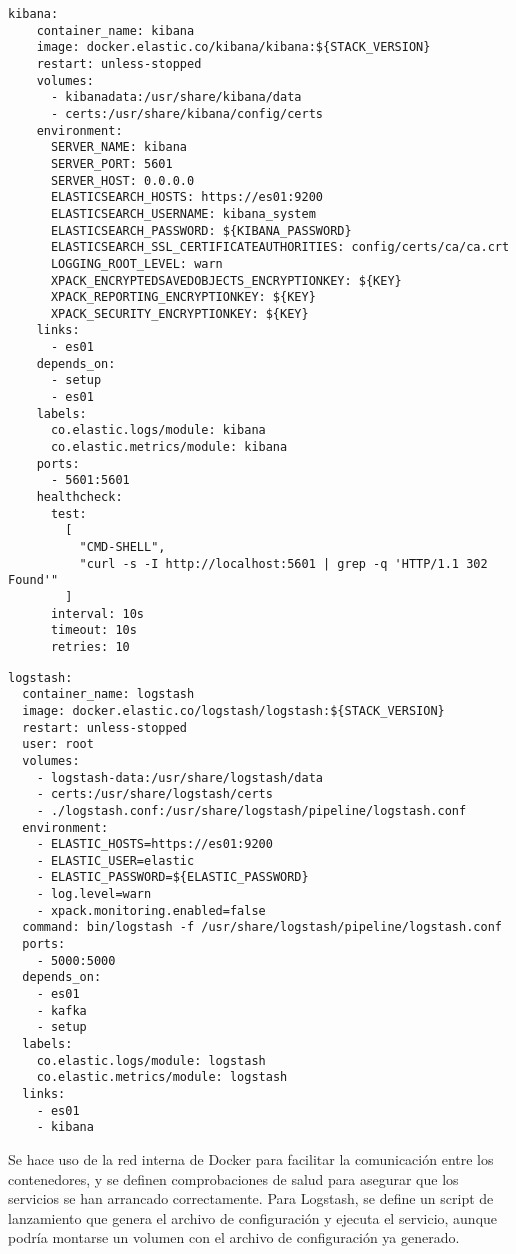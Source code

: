 \begin{lstlisting}[style=yaml, caption={Definición de los servicios de Kibana}]
kibana:
    container_name: kibana
    image: docker.elastic.co/kibana/kibana:${STACK_VERSION}
    restart: unless-stopped
    volumes:
      - kibanadata:/usr/share/kibana/data
      - certs:/usr/share/kibana/config/certs
    environment:
      SERVER_NAME: kibana
      SERVER_PORT: 5601
      SERVER_HOST: 0.0.0.0
      ELASTICSEARCH_HOSTS: https://es01:9200
      ELASTICSEARCH_USERNAME: kibana_system
      ELASTICSEARCH_PASSWORD: ${KIBANA_PASSWORD}
      ELASTICSEARCH_SSL_CERTIFICATEAUTHORITIES: config/certs/ca/ca.crt
      LOGGING_ROOT_LEVEL: warn
      XPACK_ENCRYPTEDSAVEDOBJECTS_ENCRYPTIONKEY: ${KEY}
      XPACK_REPORTING_ENCRYPTIONKEY: ${KEY}
      XPACK_SECURITY_ENCRYPTIONKEY: ${KEY}
    links:
      - es01
    depends_on:
      - setup
      - es01
    labels:
      co.elastic.logs/module: kibana
      co.elastic.metrics/module: kibana
    ports:
      - 5601:5601
    healthcheck:
      test:
        [
          "CMD-SHELL",
          "curl -s -I http://localhost:5601 | grep -q 'HTTP/1.1 302 Found'"
        ]
      interval: 10s
      timeout: 10s
      retries: 10
\end{lstlisting}

\newpage{}
\begin{lstlisting}[style=yaml, caption={Definición de los servicios de Logstash}]
logstash:
  container_name: logstash
  image: docker.elastic.co/logstash/logstash:${STACK_VERSION}
  restart: unless-stopped
  user: root
  volumes:
    - logstash-data:/usr/share/logstash/data
    - certs:/usr/share/logstash/certs
    - ./logstash.conf:/usr/share/logstash/pipeline/logstash.conf
  environment:
    - ELASTIC_HOSTS=https://es01:9200
    - ELASTIC_USER=elastic
    - ELASTIC_PASSWORD=${ELASTIC_PASSWORD}
    - log.level=warn
    - xpack.monitoring.enabled=false
  command: bin/logstash -f /usr/share/logstash/pipeline/logstash.conf
  ports:
    - 5000:5000
  depends_on:
    - es01
    - kafka
    - setup
  labels:
    co.elastic.logs/module: logstash
    co.elastic.metrics/module: logstash
  links:
    - es01
    - kibana
\end{lstlisting}

Se hace uso de la red interna de Docker para facilitar la comunicación entre los
contenedores, y se definen comprobaciones de salud para asegurar que los
servicios se han arrancado correctamente. Para Logstash, se define un script de
lanzamiento que genera el archivo de configuración y ejecuta el servicio, aunque
podría montarse un volumen con el archivo de configuración ya generado.

